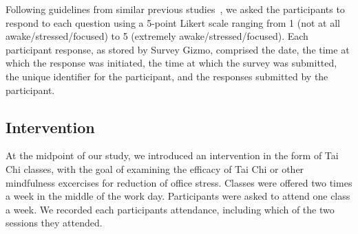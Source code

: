 Following guidelines from similar previous studies~\cite{fogarty05,tanaka11}, we asked the participants to respond to each question using a 5-point Likert scale ranging from 1 (not at all awake/stressed/focused) to 5 (extremely awake/stressed/focused). Each participant response, as stored by Survey Gizmo, comprised the date, the time at which the response was initiated, the time at which the survey was submitted, the unique identifier for the participant, and the responses submitted by the participant.

\subsection{Intervention}
At the midpoint of our study, we introduced an intervention in the form of Tai Chi classes, with the goal of examining the efficacy of Tai Chi or other mindfulness excercises for reduction of office stress. Classes were offered two times a week in the middle of the work day. Participants were asked to attend one class a week. We recorded each participants attendance, including which of the two sessions they attended.